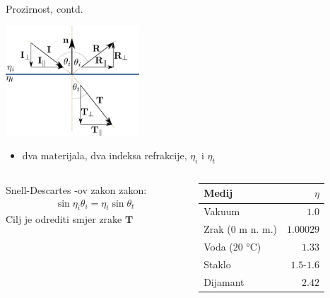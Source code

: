\documentclass[9pt]{beamer}
\begin{document}
\begin{frame}{Prozirnost, contd.}

\begin{center}
\includegraphics[width=5cm]{slike/prozirnost.png}
\end{center}
\begin{itemize}
\item dva materijala, dva indeksa refrakcije, $\eta_i$ i $\eta_t$
\end{itemize}
\begin{columns}
	\begin{column}{0.5\textwidth}
		Snell-Descartes -ov zakon zakon:
		\begin{align*}
		\sin \eta_i \theta_i = \eta_t \sin\theta_t%
		\end{align*}
		Cilj je odrediti smjer zrake $\mathbf{T}$
	\end{column}
	\begin{column}{0.5\textwidth}
		\begin{center}
			\begin{tabular}{ l r } 
				\textbf{Medij} & $\eta$ \\
				\hline
				Vakuum & $1.0$  \\ 
				Zrak ($0$ m n. m.) & $1.00029$  \\ 
				Voda ($20$ °C) & $1.33$  \\ 
				Staklo & $1.5$-$1.6$  \\ 
				Dijamant & $2.42$  \\ 
				\hline
			\end{tabular}
		\end{center}
	\end{column}
\end{columns}

\end{frame}
\end{document}

